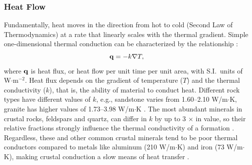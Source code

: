 \subsubsection{Heat Flow}\label{ch2:heatflow}
Fundamentally, heat moves in the direction from hot to cold (Second Law of Thermodynamics) at a rate that linearly scales with the thermal gradient. Simple one-dimensional thermal conduction can be characterized by the relationship \citep[Fourier's Law,][p.\ 270]{fowler_solid_2005}:
\begin{equation}\label{eq:conduction}
    {\bf q} = -k\nabla T,
\end{equation}
where ${\bf q}$ is heat flux, or heat flow per unit time per unit area, with S.I.\ units of W$\cdot$m$^{-2}$. Heat flux depends on the gradient of temperature ($T$) and the thermal conductivity ($k$), that is, the ability of material to conduct heat. Different rock types have different values of $k$, e.g., sandstone varies from 1.60--2.10 W/m$\cdot$K, granite has higher values of 1.73--3.98 W/m$\cdot$K \citep[p.\ 30]{dipippo_geothermal_2012}. The most abundant minerals in crustal rocks, feldspars and quartz, can differ in $k$ by up to 3 $\times$ in value, so their relative fractions strongly influence the thermal conductivity of a formation \citep[p.\ 22]{glassley_geothermal_2015}. Regardless, these and other common crustal minerals tend to be poor thermal conductors compared to metals like aluminum (210 W/m$\cdot$K) and iron (73 W/m$\cdot$K), making crustal conduction a slow means of heat transfer \citep[p.\ 23]{dipippo_geothermal_2012}.

